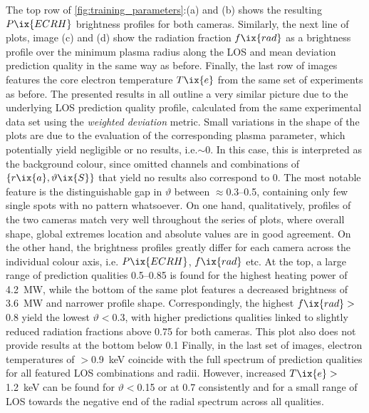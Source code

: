             The top row of \cref{fig:training_parameters}:(a) and (b) shows the resulting $P\ix{ECRH}$ brightness profiles for both cameras. Similarly, the next line of plots, image (c) and (d) show the radiation fraction $f\ix{rad}$ as a brightness profile over the minimum plasma radius along the LOS and mean deviation prediction quality in the same way as before. Finally, the last row of images features the core electron temperature $T\ix{e}$ from the same set of experiments as before. The presented results in all outline a very similar picture due to the underlying LOS prediction quality profile, calculated from the same experimental data set using the \textit{weighted deviation} metric. Small variations in the shape of the plots are due to the evaluation of the corresponding plasma parameter, which potentially yield negligible or no results, i.e.$\sim0$. In this case, this is interpreted as the background colour, since omitted channels and combinations of $\left\{r\ix{a}, \vartheta\ix{S}\right\}$ that yield no results also correspond to $0$. The most notable feature is the distinguishable gap in $\vartheta$ between $\approx$\SIrange{0.3}{0.5}{\arbitraryunit}, containing only few single spots with no pattern whatsoever. On one hand, qualitatively, profiles of the two cameras match very well throughout the series of plots, where overall shape, global extremes location and absolute values are in good agreement. On the other hand, the brightness profiles greatly differ for each camera across the individual colour axis, i.e. $P\ix{ECRH}$, $f\ix{rad}$ etc. At the top, a large range of prediction qualities \SIrange{0.5}{0.85}{\arbitraryunit} is found for the highest heating power of \SI{4.2}{\mega\watt}, while the bottom of the same plot features a decreased brightness of \SI{3.6}{\mega\watt} and narrower profile shape. Correspondingly, the highest $f\ix{rad}>$\SI{0.8}{\arbitraryunit} yield the lowest $\vartheta<$\SI{0.3}{\arbitraryunit}, with higher predictions qualities linked to slightly reduced radiation fractions above \SI{0.75}{\arbitraryunit} for both cameras. This plot also does not provide results at the bottom below \SI{0.1}{\arbitraryunit} Finally, in the last set of images, electron temperatures of $>$\SI{0.9}{\kilo\electronvolt} coincide with the full spectrum of prediction qualities for all featured LOS combinations and radii. However, increased $T\ix{e}>$\SI{1.2}{\kilo\electronvolt} can be found for $\vartheta<$\SI{0.15}{\arbitraryunit} or at \SI{0.7}{\arbitraryunit} consistently and for a small range of LOS towards the negative end of the radial spectrum across all qualities.\\%
